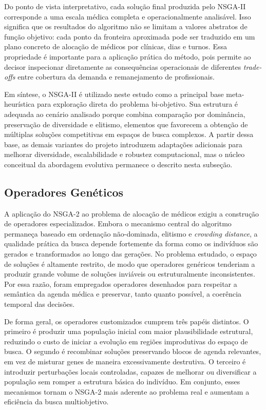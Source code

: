Do ponto de vista interpretativo, cada solução final produzida pelo NSGA-II corresponde a uma escala médica completa e operacionalmente analisável. Isso significa que os resultados do algoritmo não se limitam a valores abstratos de função objetivo: cada ponto da fronteira aproximada pode ser traduzido em um plano concreto de alocação de médicos por clínicas, dias e turnos. Essa propriedade é importante para a aplicação prática do método, pois permite ao decisor inspecionar diretamente as consequências operacionais de diferentes \textit{trade-offs} entre cobertura da demanda e remanejamento de profissionais.

Em síntese, o NSGA-II é utilizado neste estudo como a principal base meta-heurística para exploração direta do problema bi-objetivo. Sua estrutura é adequada ao cenário analisado porque combina comparação por dominância, preservação de diversidade e elitismo, elementos que favorecem a obtenção de múltiplas soluções competitivas em espaços de busca complexos. A partir dessa base, as demais variantes do projeto introduzem adaptações adicionais para melhorar diversidade, escalabilidade e robustez computacional, mas o núcleo conceitual da abordagem evolutiva permanece o descrito nesta subseção.

\subsection{Operadores Genéticos}
\label{subsec:custom-operators}

A aplicação do NSGA-2 ao problema de alocação de médicos exigiu a construção de operadores especializados. Embora o mecanismo central do algoritmo permaneça baseado em ordenação não-dominada, elitismo e \textit{crowding distance}, a qualidade prática da busca depende fortemente da forma como os indivíduos são gerados e transformados ao longo das gerações. No problema estudado, o espaço de soluções é altamente restrito, de modo que operadores genéricos tenderiam a produzir grande volume de soluções inviáveis ou estruturalmente inconsistentes. Por essa razão, foram empregados operadores desenhados para respeitar a semântica da agenda médica e preservar, tanto quanto possível, a coerência temporal das decisões.

De forma geral, os operadores customizados cumprem três papéis distintos. O primeiro é produzir uma população inicial com maior plausibilidade estrutural, reduzindo o custo de iniciar a evolução em regiões improdutivas do espaço de busca. O segundo é recombinar soluções preservando blocos de agenda relevantes, em vez de misturar genes de maneira excessivamente destrutiva. O terceiro é introduzir perturbações locais controladas, capazes de melhorar ou diversificar a população sem romper a estrutura básica do indivíduo. Em conjunto, esses mecanismos tornam o NSGA-2 mais aderente ao problema real e aumentam a eficiência da busca multiobjetivo.

